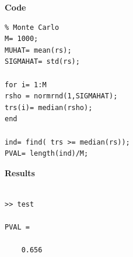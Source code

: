 \documentclass[12pt,a4paper]{article}
\begin{document}
\textbf{Code}\\
\begin{verbatim}
% Monte Carlo
M= 1000;
MUHAT= mean(rs);
SIGMAHAT= std(rs);

for i= 1:M
rsho = normrnd(1,SIGMAHAT);
trs(i)= median(rsho);
end

ind= find( trs >= median(rs));
PVAL= length(ind)/M;
\end{verbatim}

\textbf{Results}\

\begin{verbatim}

>> test

PVAL =

    0.656
\end{verbatim}
\end{document}
